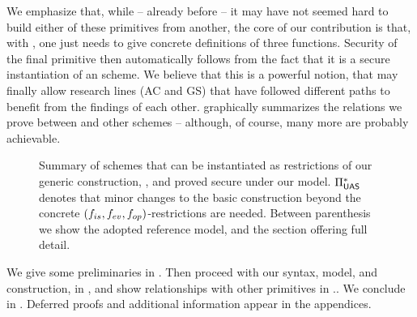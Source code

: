 We emphasize that, while -- already before \UAS -- it may have not seemed hard
to build either of these primitives from another, the core of our contribution
is that, with \UAS, one just needs to give concrete definitions of three
functions. Security of the final primitive then automatically follows from the
fact that it is a secure instantiation of an \UAS scheme. We believe that this
is a powerful notion, that may finally allow research lines (AC and GS) that
have followed different paths to benefit from the findings of each other.
 graphically summarizes the relations we prove between
\UAS and other schemes -- although, of course, many more are probably
achievable.

\begin{figure}[ht!]
  \centering
  \scalebox{0.9}{
    
  }
  \caption{Summary of schemes that can be instantiated as restrictions of our
    generic construction, \CUASGen, and proved secure under our \UAS model.
    $\Pi_{\mathsf{UAS}}^{\ast}$ denotes that minor changes to the basic construction
    beyond the concrete $(f_{is},f_{ev},f_{op})$-restrictions are needed.
    Between parenthesis we show the adopted reference model, and the section
    offering full detail.
  }
  \label{fig:relations}
\end{figure}

We give some preliminaries in . Then proceed with our
\UAS syntax, model, and construction, in , and show
relationships with other primitives in .. We conclude
in . Deferred proofs and additional information appear
in the appendices.


